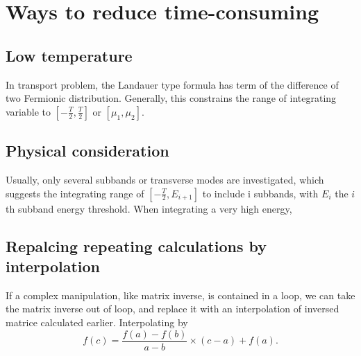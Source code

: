 \documentclass[11pt,a4paper]{article}
\begin{document}
\section{Ways to reduce time-consuming}
\subsection{Low temperature}
In transport problem, the Landauer type formula has term of the difference of two Fermionic distribution. Generally, this constrains the range of integrating variable to $[-\frac{T}{2}, \frac{T}{2}]$ or $[\mu_{1}, \mu_{2}]$.
\subsection{Physical consideration}
Usually, only several subbands or transverse modes are investigated, which suggests the integrating range of $[-\frac{T}{2}, E_{i+1}]$ to include i subbands, with $E_i$ the $i$th subband energy threshold. When integrating a very high energy, 
\subsection{Repalcing repeating calculations by interpolation}
If a complex manipulation, like matrix inverse, is contained in a loop,
we can take the matrix inverse out of loop, and replace it with an interpolation of inversed matrice calculated earlier. Interpolating by
\begin{equation}
f(c) = \frac{f(a) - f(b)}{a-b}\times (c-a) + f(a).
\end{equation}
\end{document}
